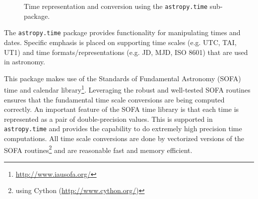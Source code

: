 \documentclass[traditabstract]{aa}
\begin{document}
\begin{figure}
\caption{Time representation and conversion using the \texttt{astropy.time} sub-package.\label{code:time}}
\end{figure}

The \texttt{astropy.time} package provides functionality for manipulating
times and dates.  Specific emphasis is placed on supporting time scales
(e.g. UTC, TAI, UT1) and time formats/representations (e.g. JD, MJD, ISO 8601) that
are used in astronomy.

This package makes use of the Standards of Fundamental Astronomy (SOFA) time
and calendar library\footnote{\url{http://www.iausofa.org/}}. Leveraging the
robust and well-tested SOFA routines ensures that the fundamental time scale
conversions are being computed correctly. An important feature of the SOFA
time library is that each time is represented as a pair of double-precision
values. This is supported in \texttt{astropy.time} and provides the capability
to do extremely high precision time computations. All time scale conversions
are done by vectorized versions of the SOFA routines\footnote{using Cython
(\url{http://www.cython.org/})} and are reasonable fast and memory efficient.
\end{document}
